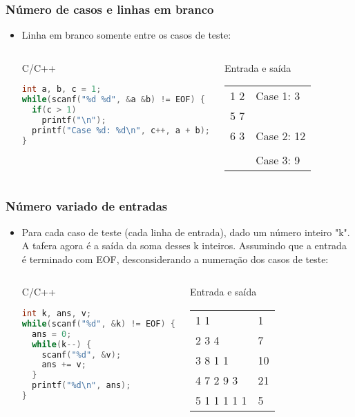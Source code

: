\begin{frame} [fragile]
  \frametitle{Número de casos e linhas em branco}
    \begin{itemize}
      \item {\small Linha em branco somente entre os casos de teste:}
      \begin{columns}
      \begin{block:ie}{C/C++}
	\begin{lstlisting}[language=c]
int a, b, c = 1;
while(scanf("%d %d", &a &b) != EOF) {
  if(c > 1)
    printf("\n");
  printf("Case %d: %d\n", c++, a + b);
}
	\end{lstlisting}
      \end{block:ie}

      \begin{block:ie}{Entrada e saída} \scriptsize
	\begin{tabularx}{\textwidth}{|X|X|}
	  1 2&Case 1: 3\\5 7&\\6 3&Case 2: 12\\&\\&Case 3: 9
	\end{tabularx}
      \end{block:ie}
    \end{columns}
  \end{itemize}
\end{frame}

\begin{frame} [fragile]
  \frametitle{Número variado de entradas}
    \begin{itemize}
      \item {\small Para cada caso de teste (cada linha de entrada), dado um número inteiro "k". A tafera agora é a saída da soma desses k inteiros. Assumindo que a entrada é terminado com EOF, desconsiderando a numeração dos casos de teste:}
      \begin{columns}
      \begin{block:ie}{C/C++}
	\begin{lstlisting}[language=c]
int k, ans, v;
while(scanf("%d", &k) != EOF) {
  ans = 0;
  while(k--) {
    scanf("%d", &v);
    ans += v;
  }
  printf("%d\n", ans);
}
	\end{lstlisting}
      \end{block:ie}

      \begin{block:ie}{Entrada e saída}\small
	\begin{tabularx}{\textwidth}{|X|X|}
	 1 1&1\\2 3 4&7\\3 8 1 1&10\\4 7 2 9 3&21\\5 1 1 1 1 1&5
	\end{tabularx}
      \end{block:ie}
    \end{columns}
  \end{itemize}
\end{frame}